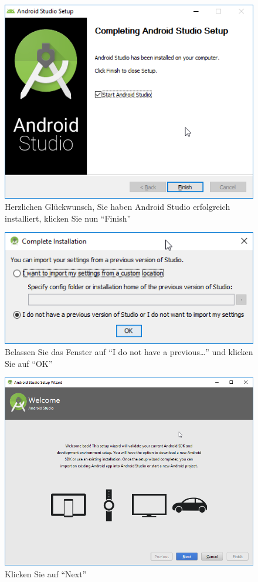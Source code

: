 \documentclass[a4paper,10pt,xetex]{article}
\begin{document}
\begin{figure}
  \centering
  \includegraphics[width=\textwidth]{Installation/1-8}
  \caption{Herzlichen Glückwunsch, Sie haben Android Studio erfolgreich installiert, klicken Sie nun ``Finish'' }
\end{figure}

\begin{figure}
  \centering
  \includegraphics[width=\textwidth]{Installation/1-9}
  \caption{Belassen Sie das Fenster auf ``I do not have a previous\ldots'' und klicken Sie auf ``OK''}
\end{figure}

\begin{figure}
  \centering
  \includegraphics[width=\textwidth]{Installation/1-10}
  \caption{Klicken Sie auf ``Next''}
\end{figure}
\end{document}
